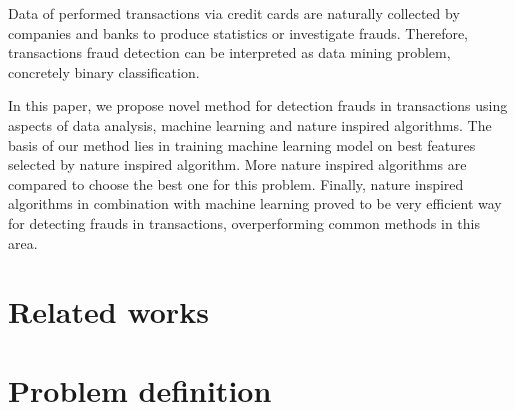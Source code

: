 \documentclass[runningheads]{llncs}
\begin{document}
Data of performed transactions via credit cards are naturally collected by companies and banks to produce statistics or investigate frauds. Therefore, transactions fraud detection can be interpreted as data mining problem, concretely binary classification.

In this paper, we propose novel method for detection frauds in transactions using aspects of data analysis, machine learning and nature inspired algorithms. The basis of our method lies in training machine learning model on best features selected by nature inspired algorithm. More nature inspired algorithms are compared to choose the best one for this problem. Finally, nature inspired algorithms in combination with machine learning proved to be very efficient way for detecting frauds in transactions, overperforming common methods in this area.



\section{Related works}




\section{Problem definition}
\end{document}
